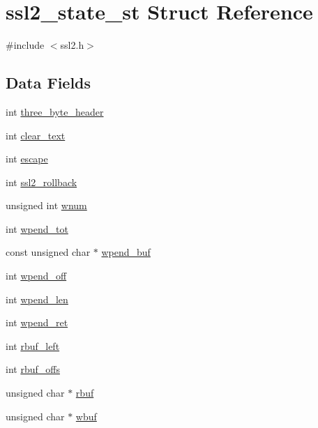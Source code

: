 \hypertarget{structssl2__state__st}{}\section{ssl2\+\_\+state\+\_\+st Struct Reference}
\label{structssl2__state__st}


{\ttfamily \#include $<$ssl2.\+h$>$}

\subsection*{Data Fields}
\begin{DoxyCompactItemize}
\item 
int \hyperlink{structssl2__state__st_ae28f3e3ae9102f513834257387622782}{three\+\_\+byte\+\_\+header}
\item 
int \hyperlink{structssl2__state__st_a8ae8a6a0484548f5e03fdd54b1d2719a}{clear\+\_\+text}
\item 
int \hyperlink{structssl2__state__st_acf78d5ab53d26add4184578b9732a6a0}{escape}
\item 
int \hyperlink{structssl2__state__st_a1fa10334785eba61a04ba5aec10c8644}{ssl2\+\_\+rollback}
\item 
unsigned int \hyperlink{structssl2__state__st_a2255b8340cdda4fd06078836b88485b8}{wnum}
\item 
int \hyperlink{structssl2__state__st_a11c4b34b49cb1ce9711d3b4f993980fb}{wpend\+\_\+tot}
\item 
const unsigned char $\ast$ \hyperlink{structssl2__state__st_ae1aceb1506bb5d92de935aed9b925959}{wpend\+\_\+buf}
\item 
int \hyperlink{structssl2__state__st_acee692314aac6c9b66e59e142a214e4b}{wpend\+\_\+off}
\item 
int \hyperlink{structssl2__state__st_a7cd33d0c7f2696b03ae4b2594f7bc3c3}{wpend\+\_\+len}
\item 
int \hyperlink{structssl2__state__st_ae2dce92eac9ce1ec1dc53125a72f87b4}{wpend\+\_\+ret}
\item 
int \hyperlink{structssl2__state__st_ab8cb4b9c354f36b59919640e19959337}{rbuf\+\_\+left}
\item 
int \hyperlink{structssl2__state__st_ab75ecb8b9865875235f7bbfa78dabb8e}{rbuf\+\_\+offs}
\item 
unsigned char $\ast$ \hyperlink{structssl2__state__st_a0029aad99354b59325c62ecf4533ae18}{rbuf}
\item 
unsigned char $\ast$ \hyperlink{structssl2__state__st_a35e409dd4e88613e47b490150f06e8e4}{wbuf}

\end{DoxyCompactItemize}

